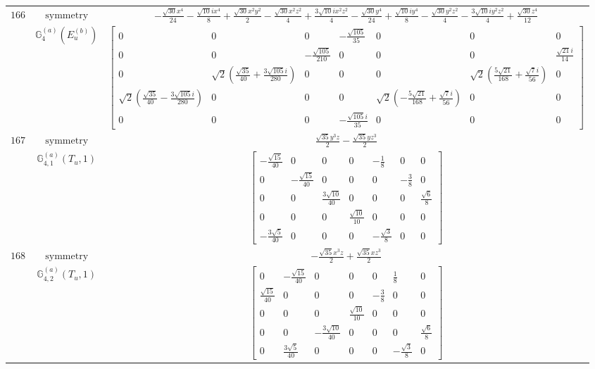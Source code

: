 \documentclass[fleqn,8pt,landscape]{jsarticle}
\begin{document}
\begin{longtable}{ccc}
$ 166 $ & $ \text{symmetry} $ & $ - \frac{\sqrt{30} x^{4}}{24} - \frac{\sqrt{10} i x^{4}}{8} + \frac{\sqrt{30} x^{2} y^{2}}{2} - \frac{\sqrt{30} x^{2} z^{2}}{4} + \frac{3 \sqrt{10} i x^{2} z^{2}}{4} - \frac{\sqrt{30} y^{4}}{24} + \frac{\sqrt{10} i y^{4}}{8} - \frac{\sqrt{30} y^{2} z^{2}}{4} - \frac{3 \sqrt{10} i y^{2} z^{2}}{4} + \frac{\sqrt{30} z^{4}}{12} $ \\
$  $ & $ \mathbb{G}_{4}^{(a)}(E_{u}^{(b)}) $ & $ \begin{bmatrix} 0 & 0 & 0 & - \frac{\sqrt{105}}{35} & 0 & 0 & 0 \\ 0 & 0 & - \frac{\sqrt{105}}{210} & 0 & 0 & 0 & \frac{\sqrt{21} i}{14} \\ 0 & \sqrt{2} \left(\frac{\sqrt{35}}{40} + \frac{3 \sqrt{105} i}{280}\right) & 0 & 0 & 0 & \sqrt{2} \left(\frac{5 \sqrt{21}}{168} + \frac{\sqrt{7} i}{56}\right) & 0 \\ \sqrt{2} \left(\frac{\sqrt{35}}{40} - \frac{3 \sqrt{105} i}{280}\right) & 0 & 0 & 0 & \sqrt{2} \left(- \frac{5 \sqrt{21}}{168} + \frac{\sqrt{7} i}{56}\right) & 0 & 0 \\ 0 & 0 & 0 & - \frac{\sqrt{105} i}{35} & 0 & 0 & 0 \end{bmatrix} $ \\ \hline
$ 167 $ & $ \text{symmetry} $ & $ \frac{\sqrt{35} y^{3} z}{2} - \frac{\sqrt{35} y z^{3}}{2} $ \\
$  $ & $ \mathbb{G}_{4,1}^{(a)}(T_{u},1) $ & $ \begin{bmatrix} - \frac{\sqrt{15}}{40} & 0 & 0 & 0 & - \frac{1}{8} & 0 & 0 \\ 0 & - \frac{\sqrt{15}}{40} & 0 & 0 & 0 & - \frac{3}{8} & 0 \\ 0 & 0 & \frac{3 \sqrt{10}}{40} & 0 & 0 & 0 & \frac{\sqrt{6}}{8} \\ 0 & 0 & 0 & \frac{\sqrt{10}}{10} & 0 & 0 & 0 \\ - \frac{3 \sqrt{5}}{40} & 0 & 0 & 0 & - \frac{\sqrt{3}}{8} & 0 & 0 \end{bmatrix} $ \\ \hline
$ 168 $ & $ \text{symmetry} $ & $ - \frac{\sqrt{35} x^{3} z}{2} + \frac{\sqrt{35} x z^{3}}{2} $ \\
$  $ & $ \mathbb{G}_{4,2}^{(a)}(T_{u},1) $ & $ \begin{bmatrix} 0 & - \frac{\sqrt{15}}{40} & 0 & 0 & 0 & \frac{1}{8} & 0 \\ \frac{\sqrt{15}}{40} & 0 & 0 & 0 & - \frac{3}{8} & 0 & 0 \\ 0 & 0 & 0 & \frac{\sqrt{10}}{10} & 0 & 0 & 0 \\ 0 & 0 & - \frac{3 \sqrt{10}}{40} & 0 & 0 & 0 & \frac{\sqrt{6}}{8} \\ 0 & \frac{3 \sqrt{5}}{40} & 0 & 0 & 0 & - \frac{\sqrt{3}}{8} & 0 \end{bmatrix} $ \\ \hline

\end{longtable}
\end{document}
